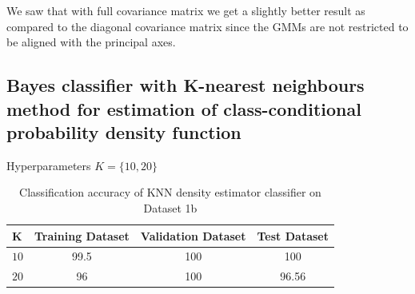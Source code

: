 \documentclass[11pt]{article}
\begin{document}
We saw that with full covariance matrix we get a slightly better result as compared to the diagonal covariance matrix since the GMMs are not restricted to be aligned with the principal axes.

\newpage
\subsection{Bayes classifier with K-nearest neighbours method for estimation of class-conditional probability density function}

Hyperparameters $K = \{10,20\}$
\begin{table}[h!]
\label{tab:tab1.1.1}
\begin{center}
\begin{tabular}{|l|c|c|c|}
\hline
\textbf{K } & \textbf{Training Dataset} & \textbf{Validation Dataset} &\textbf{Test Dataset}\\
\hline
$10$ & 99.5 & 100 & 100\\
\hline
$20$ & 96 & 100 & 96.56\\
\hline
\end{tabular}
\caption{Classification accuracy of KNN density estimator classifier on Dataset 1b}
\end{center}
\end{table}
\end{document}
